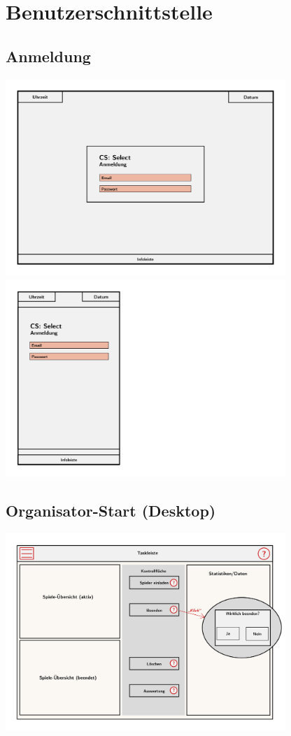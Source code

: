 \documentclass[a4paper]{scrreprt}
\begin{document}
    \section{Benutzerschnittstelle}

    \subsection{Anmeldung}
    \centering
    \includegraphics[width=400px]{../pictures/1_Anmeldung.jpg}
    \includegraphics[width=400px]{../pictures/1_Anmeldung(Responsiv).jpg}

    \subsection{Organisator-Start (Desktop)}
    \centering
    \includegraphics[width=400px]{../pictures/2_Organisator.jpg}
\end{document}
